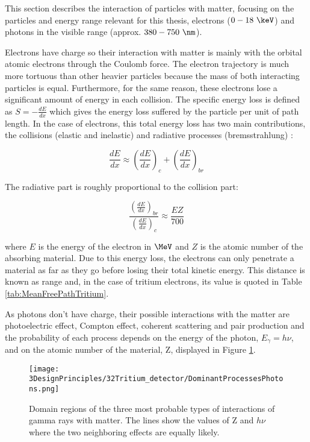 This section describes the interaction of particles with matter, focusing on the particles and energy range relevant for this thesis, electrons ($0-18~\keV$) and photons in the visible range (approx. $380-750~\nm$).

Electrons have charge so their interaction with matter is mainly with the orbital atomic  electrons through the Coulomb force. The electron trajectory is much more tortuous than other heavier particles because the mass of both interacting particles is equal. Furthermore, for the same reason, these electrons lose a significant amount of energy in each collision. The specific energy loss is defined as $S=-\frac{dE}{dx}$ which gives the energy loss suffered by the particle per unit of path length. In the case of electrons, this total energy loss has two main contributions, the collisions (elastic and inelastic) and radiative processes (bremsstrahlung) \cite{Knoll, Leo}:

\begin{equation}
\frac{dE}{dx} \approx \left(\frac{dE}{dx}\right)_{c} + \left(\frac{dE}{dx}\right)_{br} 
\label{eq:ElectronInteraction}
\end{equation}

The radiative part is roughly proportional to the collision part:

\begin{equation}
\frac{\left(\frac{dE}{dx}\right)_{br}}{\left(\frac{dE}{dx}\right)_{c}} \approx \frac{EZ}{700}
\label{eq:ProportionalMagnituds}
\end{equation}

where $E$ is the energy of the electron in $\MeV$ and $Z$ is the atomic number of the absorbing material. Due to this energy loss, the electrons can only penetrate a material as far as they go before losing their total kinetic energy. This distance is known as range and, in the case of tritium electrons, its value is quoted in Table \ref{tab:MeanFreePathTritium}.

As photons don't have charge, their possible interactions with the matter are photoelectric effect, Compton effect, coherent scattering and pair production and the probability of each process depends on the energy of the photon, $E_\gamma = h\nu$, and on the atomic number of the material, Z, displayed in Figure \ref{fig:ProcessesPhotons}.

\begin{figure}[htbp]
\centering
\texttt{[image: 3DesignPrinciples/32Tritium\_detector/DominantProcessesPhotons.png]}
\caption{Domain regions of the three most probable types of interactions of gamma rays with matter. The lines show the values of Z and $h\nu$ where the two neighboring effects are equally likely.\label{fig:ProcessesPhotons}~\cite{Knoll, Leo}}
\end{figure}

